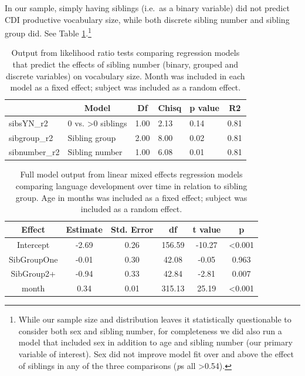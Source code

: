 \documentclass[
  man,mask,floatsintext]{apa6}
\begin{document}
In our sample, simply having siblings (i.e.~as a binary variable) did not predict CDI productive vocabulary size, while both discrete sibling number and sibling group did. See Table \ref{tab:table-sibling-model-output}.\footnote{While our sample size and distribution leaves it statistically questionable to consider both sex and sibling number, for completeness we did also run a model that included sex in addition to age and sibling number (our primary variable of interest). Sex did not improve model fit over and above the effect of siblings in any of the three comparisons (\emph{p}s all \textgreater0.54).}

\begin{table}[H]

\begin{center}
\begin{threeparttable}

\caption{\label{tab:table-sibling-model-output}Output from likelihood ratio tests comparing regression models that predict the effects of sibling number (binary, grouped and discrete variables) on vocabulary size. Month was included in each model as a fixed effect; subject was included as a random effect.}

\small{

\begin{tabular}{llllll}
\toprule
 & \multicolumn{1}{c}{Model} & \multicolumn{1}{c}{Df} & \multicolumn{1}{c}{Chisq} & \multicolumn{1}{c}{p value} & \multicolumn{1}{c}{R2}\\
\midrule
sibsYN\_r2 & 0 vs. >0 siblings & 1.00 & 2.13 & 0.14 & 0.81\\
sibgroup\_r2 & Sibling group & 2.00 & 8.00 & 0.02 & 0.81\\
sibnumber\_r2 & Sibling number & 1.00 & 6.08 & 0.01 & 0.81\\
\bottomrule
\end{tabular}

}

\end{threeparttable}
\end{center}

\end{table}

\begin{longtable}[t]{cccccc}
\caption{\label{tab:table-sibgroup-model-summary}Full model output from linear mixed effects regression models comparing language development over time in relation to sibling group. Age in months was included as a fixed effect; subject was included as a random effect.}\\
\toprule
Effect & Estimate & Std. Error & df & t value & p\\
\midrule
Intercept & -2.69 & 0.26 & 156.59 & -10.27 & <0.001\\
SibGroupOne & -0.01 & 0.30 & 42.08 & -0.05 & 0.963\\
SibGroup2+ & -0.94 & 0.33 & 42.84 & -2.81 & 0.007\\
month & 0.34 & 0.01 & 315.13 & 25.19 & <0.001\\
\bottomrule
\end{longtable}
\end{document}
